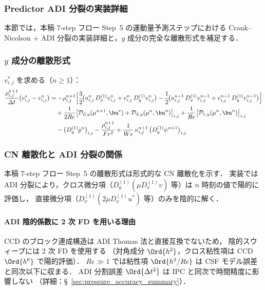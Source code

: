 
\subsubsection{Predictor ADI 分裂の実装詳細}
\label{app:predictor_adi}

本節では，本稿 7-step フロー Step~5 の運動量予測ステップにおける
Crank--Nicolson + ADI 分裂の実装詳細と，$y$ 成分の完全な離散形式を補足する．

\subsubsection{\texorpdfstring{$y$ 成分の離散形式}{y 成分の離散形式}}
\label{app:predictor_y}

$v^*_{i,j}$ を求める（$n \ge 1$）：
\begin{align*}
  \frac{\rho^{n+1}_{i,j}}{\Delta t}\bigl(v^*_{i,j} - v^n_{i,j}\bigr)
  &= -\rho^{n+1}_{i,j}\Bigl[
      \frac{3}{2}\!\bigl(u^n_{i,j}\,D_x^{(1)} v^n_{i,j} + v^n_{i,j}\,D_y^{(1)} v^n_{i,j}\bigr)
      -\frac{1}{2}\!\bigl(u^{n-1}_{i,j}\,D_x^{(1)} v^{n-1}_{i,j} + v^{n-1}_{i,j}\,D_y^{(1)} v^{n-1}_{i,j}\bigr)
    \Bigr] \\
  &\quad + \frac{1}{2Re}\bigl[
      \mathcal{D}_{\mathrm{d},y}(\mu^{n+1}, \bu^*)
      + \mathcal{D}_{\mathrm{d},y}(\mu^n, \bu^n)
    \bigr]_{i,j}
    + \frac{1}{Re}\bigl[\mathcal{D}_{\mathrm{c},y}(\mu^n, \bu^n)\bigr]_{i,j} \\
  &\quad - \bigl(D_y^{(1)} p^n\bigr)_{i,j}
         - \frac{\rho^{n+1}_{i,j}}{Fr^2}
         + \frac{1}{We}\,\kappa^{n+1}_{i,j}\,\bigl(D_y^{(1)}\psi^{n+1}\bigr)_{i,j}
\end{align*}

\subsubsection{CN 離散化と ADI 分裂の関係}
\label{app:cn_adi_detail}

本稿 7-step フロー Step~5 の離散形式は形式的な CN 離散化を示す．
実装では ADI 分裂により，クロス微分項（$D_y^{(1)}(\mu D_x^{(1)} v)$ 等）は $n$ 時刻の値で陽的に評価し，
直接微分項（$D_x^{(1)}(2\mu D_x^{(1)} u^*)$ 等）のみを陰的に解く．

\paragraph{ADI 陰的係数に 2 次 FD を用いる理由}
CCD のブロック連成構造は ADI Thomas 法と直接互換でないため，
陰的スウィープには 2 次 FD を使用する
（対角成分 $\Ord{h^2}$，クロス粘性項は CCD $\Ord{h^6}$ で陽的評価）．
$Re \gg 1$ では粘性項 $\Ord{h^2/Re}$ は CSF モデル誤差と同次以下に収まる．
ADI 分割誤差 $\Ord{\Delta t^2}$ は IPC と同次で時間精度に影響しない
（詳細：§~\ref{sec:pressure_accuracy_summary}）．

